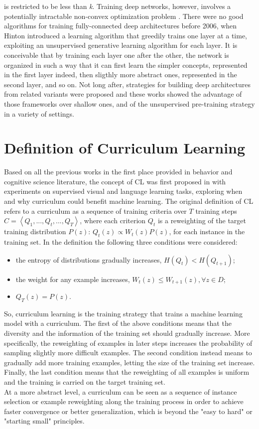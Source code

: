 is restricted to be less than \textit{k}. Training deep networks, however, involves a potentially 
intractable non-convex optimization problem \cite{bengio2009curriculum}. There were no good algorithms for training 
fully-connected deep architectures before 2006, when Hinton introduced a learning algorithm that greedily trains one layer at a time, exploiting an unsupervised
generative learning algorithm for each layer. It is conceivable that by training 
each layer one after the other, the network is organized in such a way that it can first learn the simpler
concepts, represented in the first layer indeed, then sligthly more abstract ones, represented in the second layer, and so on.
Not long after, strategies for building deep architectures from related variants were proposed %
and these works showed the advantage of those frameworks over shallow ones, and of the unsupervised 
pre-training strategy in a variety of settings.\\

\section{Definition of Curriculum Learning}
Based on all the previous works in the first place provided in behavior and 
cognitive science literature, the concept of CL was first proposed in \cite{bengio2009curriculum} with 
experiments on supervised visual and language learning tasks, exploring when and why curriculum could benefit machine learning.
The original definition of CL refers to a curriculum as a sequence of training criteria 
over \(T\) training steps \( C = \left \langle Q_1, ..., Q_t, ..., Q_T \right \rangle\), where each  
criterion \(Q_t\) is a reweighting of the target training distribution \(P(z)\): \(Q_t(z) \propto W_t(z)P(z)\), for 
each instance in the training set. In the definition the following three conditions were considered:
\begin{itemize}
    \item the entropy of distributions gradually increases, \(H(Q_t) < H(Q_{t+1})\);
    \item the weight for any example increases, \(W_t(z) \leq W_{t+1}(z),  \forall z \in D\);
    \item \(Q_T(z) = P(z)\).
\end{itemize}
So, curriculum learning is the training strategy that trains a machine learning model
with a curriculum. The first of the above conditions means that the diversity 
and the information of the training set should gradually increase. More specifically,
the reweighting of examples in later steps increases the probability of sampling slightly more difficult examples.
The second condition instead means to gradually add more training examples, letting the size of the training set increase. 
Finally, the last condition
means that the reweighting of all examples is uniform and the training is carried on the target training set.\\
At a more abstract level, a curriculum can be seen as a sequence of instance selection or example reweighting along the training process in order to achieve faster convergence or better generalization, 
which is beyond the "easy to hard" or "starting small" principles. 

